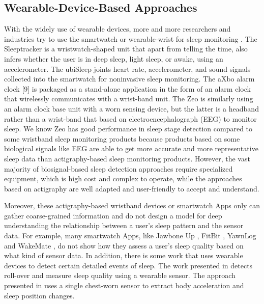 \subsection{Wearable-Device-Based Approaches}
 With the widely use of wearable devices, more and more researchers and industries try to use the smartwatch or wearable-wrist for sleep
 monitoring \cite{bain2003evaluation,bonnet2003insomnia,pombo2016ubisleep,caviness1996myoclonus}. The Sleeptracker \cite{sleeptracker} is a
 wristwatch-shaped unit that apart from telling the time, also infers whether the user is in deep sleep, light sleep, or awake, using an
 accelerometer. The ubiSleep \cite{pombo2016ubisleep} joints heart rate, accelerometer, and sound signals collected into the smartwatch for
 noninvasive sleep monitoring. The aXbo alarm clock [9] is packaged as a stand-alone application in the form of an alarm clock that
 wirelessly communicates with a wrist-band unit. The Zeo \cite{caviness1996myoclonus} is similarly using an alarm clock base unit with a
 worn sensing device, but the latter is a headband rather than a wrist-band that based on electroencephalograph (EEG) to monitor sleep. We
 know Zeo has good performance in sleep stage detection compared to some wristband sleep monitoring products because products based on some
 biological signals like EEG are able to get more accurate and more representative sleep data than actigraphy-based \cite{Actigraphy} sleep
 monitoring products. However, the vast majority of biosignal-based sleep detection approaches require specialized equipment, which is high
 cost and complex to operate, while the approaches based on actigraphy are well
adapted and user-friendly to accept and understand.

Moreover, these actigraphy-based wristband devices or smartwatch Apps only can gather coarse-grained information and  do not design a model
for deep understanding the relationship between a user's sleep pattern and the sensor data. For example, many smartwatch Apps, like Jawbone
Up \cite{Jawbone}, FitBit \cite{fitbit}, YawnLog \cite{YawnLog} and WakeMate \cite{WakeMate}, do not show how they assess a user's sleep
quality based on what kind of sensor data. In addition,  there is some work that uses wearable devices to detect certain detailed events of
sleep. The work presented in \cite{wear_related2} detects roll-over and measure sleep quality using a wearable sensor. The approach
presented in \cite{wear_related3} uses a single chest-worn sensor to extract body acceleration and sleep position changes.


